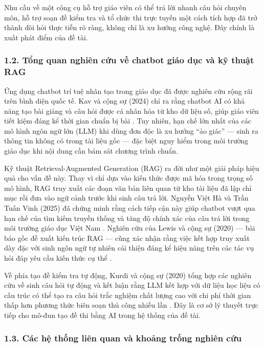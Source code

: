 \documentclass[12pt,a4paper]{article}
\begin{document}
	Nhu cầu về một công cụ hỗ trợ giáo viên có thể trả lời nhanh câu hỏi chuyên môn, hỗ trợ soạn đề kiểm tra và tổ chức thi trực tuyến một cách tích hợp đã trở thành đòi hỏi thực tiễn rõ ràng, không chỉ là xu hướng công nghệ. Đây chính là xuất phát điểm của đề tài.
	
	\subsubsection*{1.2. Tổng quan nghiên cứu về chatbot giáo dục và kỹ thuật RAG}
	
	Ứng dụng chatbot trí tuệ nhân tạo trong giáo dục đã được nghiên cứu rộng rãi trên bình diện quốc tế. Kav và cộng sự (2024) chỉ ra rằng chatbot AI có khả năng tạo bài giảng và câu hỏi được cá nhân hóa từ kho dữ liệu số, giúp giáo viên tiết kiệm đáng kể thời gian chuẩn bị bài \cite{kav2024}. Tuy nhiên, hạn chế lớn nhất của các mô hình ngôn ngữ lớn (LLM) khi dùng đơn độc là xu hướng ``ảo giác'' --- sinh ra thông tin không có trong tài liệu gốc --- đặc biệt nguy hiểm trong môi trường giáo dục khi nội dung cần bám sát chương trình chuẩn.
	
	Kỹ thuật Retrieval-Augmented Generation (RAG) ra đời như một giải pháp hiệu quả cho vấn đề này. Thay vì chỉ dựa vào kiến thức được mã hóa trong trọng số mô hình, RAG truy xuất các đoạn văn bản liên quan từ kho tài liệu đã lập chỉ mục rồi đưa vào ngữ cảnh trước khi sinh câu trả lời. Nguyễn Việt Hà và Trần Tuấn Vinh (2025) đã chứng minh rằng cách tiếp cận này giúp chatbot vượt qua hạn chế của tìm kiếm truyền thống và tăng độ chính xác của câu trả lời trong môi trường giáo dục Việt Nam \cite{nguyen2025rag}. Nghiên cứu của Lewis và cộng sự (2020) --- bài báo gốc đề xuất kiến trúc RAG --- cũng xác nhận rằng việc kết hợp truy xuất dày đặc với sinh ngôn ngữ tự nhiên cải thiện đáng kể hiệu năng trên các tác vụ hỏi đáp yêu cầu kiến thức cụ thể \cite{lewis2020rag}.
	
	Về phía tạo đề kiểm tra tự động, Kurdi và cộng sự (2020) tổng hợp các nghiên cứu về sinh câu hỏi tự động và kết luận rằng LLM kết hợp với dữ liệu học liệu có cấu trúc có thể tạo ra câu hỏi trắc nghiệm chất lượng cao với chi phí thời gian thấp hơn phương thức biên soạn thủ công nhiều lần \cite{kurdi2020qg}. Đây là cơ sở lý thuyết trực tiếp cho mô-đun tạo đề thi bằng AI trong hệ thống của đề tài.
	
	\subsubsection*{1.3. Các hệ thống liên quan và khoảng trống nghiên cứu}
	
\end{document}
